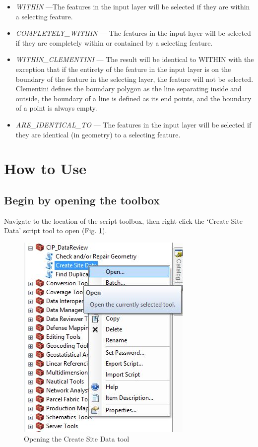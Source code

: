 \documentclass[openany]{book}
\theoremstyle{definition}
\theoremstyle{definition}
\theoremstyle{definition}
\theoremstyle{remark}
\begin{document}
\begin{enumerate}
\begin{itemize}
  \item
    \emph{WITHIN} ---The features in the input layer will be selected if
    they are within a selecting feature.\\
  \item
    \emph{COMPLETELY\_WITHIN} --- The features in the input layer will
    be selected if they are completely within or contained by a
    selecting feature.\\
  \item
    \emph{WITHIN\_CLEMENTINI} --- The result will be identical to WITHIN
    with the exception that if the entirety of the feature in the input
    layer is on the boundary of the feature in the selecting layer, the
    feature will not be selected. Clementini defines the boundary
    polygon as the line separating inside and outside, the boundary of a
    line is defined as its end points, and the boundary of a point is
    always empty.\\
  \item
    \emph{ARE\_IDENTICAL\_TO} --- The features in the input layer will
    be selected if they are identical (in geometry) to a selecting
    feature.
  \end{itemize}
\end{enumerate}

\section{How to Use}\label{how-to-use}

\subsection{Begin by opening the
toolbox}\label{begin-by-opening-the-toolbox}

Navigate to the location of the script toolbox, then right-click the
`Create Site Data' script tool to open (Fig. \ref{fig:csdopen}).

\begin{figure}[H]

{\centering \includegraphics{figures/csd-open} 

}

\caption{Opening the Create Site Data tool}\label{fig:csdopen}
\end{figure}
\end{document}
